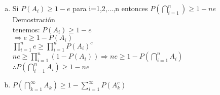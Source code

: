 \documentclass[12pt]{article}
\begin{document}
\begin{enumerate}
\begin{enumerate}[a)]
\item Si $P\left(A_{i}\right) \geq 1-e$ para i=1,2,...,n entonces $P\left(\displaystyle\bigcap_{i=1}^{n}\right)\geq 1-ne$\\[0.2cm]

Demostración\\[0.2cm]
tenemos: $P\left(A_{i}\right)\geqslant 1-e$\\[0.2cm]
	$\Rightarrow e \geqslant 1-P\left(A_{i}\right)$\\[0.2cm]
	$ \displaystyle\prod_{i=1}^{n}e \geqslant \displaystyle\prod_{i=1}^{n}P\left(A_{i}\right)^c$\\[0.2cm]
$ne \geqslant \displaystyle\prod_{i=1}^{n}\left(1- P{\left(A_{i}\right)}\right)\Rightarrow ne\geqslant 1-P\left(\displaystyle\bigcap_{i=1}^{n}A_i\right)$ \\[0.2cm]
$\therefore P\left(\displaystyle\bigcap_{i=1}^{n}A_i\right)\geqslant 1-ne $
			 
		
\item $P\left(\displaystyle\bigcap_{k=1}^{\infty}{A_k}\right) \geqslant 1-\displaystyle\sum_{i=1}^{\infty}P\left(A_{k}^{c}\right) $
\end{enumerate}


\end{enumerate}
\end{document}

